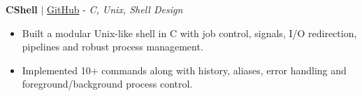 \documentclass[letterpaper,11pt]{article}
\newcommand{\resumeItem}[1]{
  \item\small{
    {#1 \vspace{-2pt}}
  }
}
\newcommand{\resumeItemListStart}{\begin{itemize}[leftmargin=0.15in, topsep=2pt, partopsep=0pt, parsep=0pt, itemsep=2pt]}
\newcommand{\resumeItemListEnd}{\end{itemize}\vspace{-5pt}}
\begin{document}
\textbf{CShell} $|$ \href{https://github.com/Nidhishj/C-shell}{GitHub} - \small{\textit{C, Unix, Shell Design}} \\
\resumeItemListStart
\resumeItem{Built a modular Unix-like shell in C with job control, signals, I/O redirection, pipelines and robust process management.}
\vspace{2pt}
\resumeItem{Implemented 10+ commands along with history, aliases, error handling and foreground/background process control.}
\resumeItemListEnd





\end{document}
